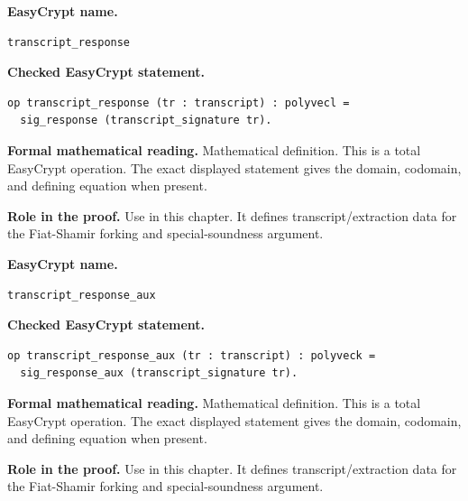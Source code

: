 \begin{formaldefinition}
\noindent\textbf{EasyCrypt name.}
\begin{lstlisting}[language=EasyCrypt,basicstyle=\ttfamily\scriptsize]
transcript_response
\end{lstlisting}
\noindent\textbf{Checked EasyCrypt statement.}
\begin{lstlisting}[language=EasyCrypt,basicstyle=\ttfamily\scriptsize]
op transcript_response (tr : transcript) : polyvecl =
  sig_response (transcript_signature tr).
\end{lstlisting}
\noindent\textbf{Formal mathematical reading.}
Mathematical definition. This is a total EasyCrypt operation.  The exact displayed statement gives the domain, codomain, and defining equation when present.

\noindent\textbf{Role in the proof.}
Use in this chapter. It defines transcript/extraction data for the Fiat-Shamir forking and special-soundness argument.

\end{formaldefinition}

\begin{formaldefinition}
\noindent\textbf{EasyCrypt name.}
\begin{lstlisting}[language=EasyCrypt,basicstyle=\ttfamily\scriptsize]
transcript_response_aux
\end{lstlisting}
\noindent\textbf{Checked EasyCrypt statement.}
\begin{lstlisting}[language=EasyCrypt,basicstyle=\ttfamily\scriptsize]
op transcript_response_aux (tr : transcript) : polyveck =
  sig_response_aux (transcript_signature tr).
\end{lstlisting}
\noindent\textbf{Formal mathematical reading.}
Mathematical definition. This is a total EasyCrypt operation.  The exact displayed statement gives the domain, codomain, and defining equation when present.

\noindent\textbf{Role in the proof.}
Use in this chapter. It defines transcript/extraction data for the Fiat-Shamir forking and special-soundness argument.

\end{formaldefinition}

